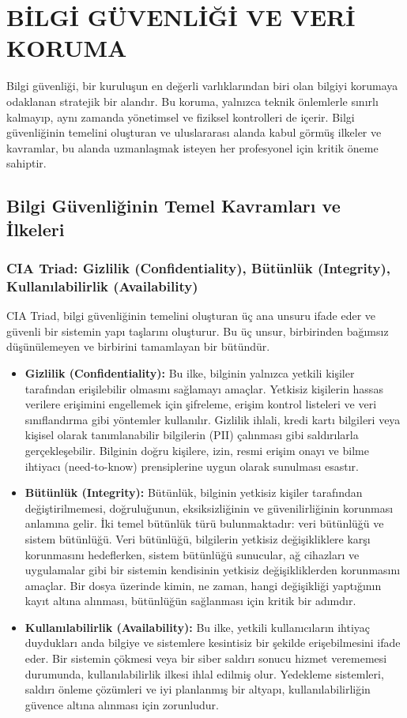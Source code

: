 \chapter{BİLGİ GÜVENLİĞİ VE VERİ KORUMA}

Bilgi güvenliği, bir kuruluşun en değerli varlıklarından biri olan bilgiyi korumaya odaklanan stratejik bir alandır. Bu koruma, yalnızca teknik önlemlerle sınırlı kalmayıp, aynı zamanda yönetimsel ve fiziksel kontrolleri de içerir. Bilgi güvenliğinin temelini oluşturan ve uluslararası alanda kabul görmüş ilkeler ve kavramlar, bu alanda uzmanlaşmak isteyen her profesyonel için kritik öneme sahiptir.

\section{Bilgi Güvenliğinin Temel Kavramları ve İlkeleri}

\subsection{CIA Triad: Gizlilik (Confidentiality), Bütünlük (Integrity), Kullanılabilirlik (Availability)}

CIA Triad, bilgi güvenliğinin temelini oluşturan üç ana unsuru ifade eder ve güvenli bir sistemin yapı taşlarını oluşturur. Bu üç unsur, birbirinden bağımsız düşünülemeyen ve birbirini tamamlayan bir bütündür.

\begin{itemize}
    \item \textbf{Gizlilik (Confidentiality):} Bu ilke, bilginin yalnızca yetkili kişiler tarafından erişilebilir olmasını sağlamayı amaçlar. Yetkisiz kişilerin hassas verilere erişimini engellemek için şifreleme, erişim kontrol listeleri ve veri sınıflandırma gibi yöntemler kullanılır. Gizlilik ihlali, kredi kartı bilgileri veya kişisel olarak tanımlanabilir bilgilerin (PII) çalınması gibi saldırılarla gerçekleşebilir. Bilginin doğru kişilere, izin, resmi erişim onayı ve bilme ihtiyacı (need-to-know) prensiplerine uygun olarak sunulması esastır.
    \item \textbf{Bütünlük (Integrity):} Bütünlük, bilginin yetkisiz kişiler tarafından değiştirilmemesi, doğruluğunun, eksiksizliğinin ve güvenilirliğinin korunması anlamına gelir. İki temel bütünlük türü bulunmaktadır: veri bütünlüğü ve sistem bütünlüğü. Veri bütünlüğü, bilgilerin yetkisiz değişikliklere karşı korunmasını hedeflerken, sistem bütünlüğü sunucular, ağ cihazları ve uygulamalar gibi bir sistemin kendisinin yetkisiz değişikliklerden korunmasını amaçlar. Bir dosya üzerinde kimin, ne zaman, hangi değişikliği yaptığının kayıt altına alınması, bütünlüğün sağlanması için kritik bir adımdır.
    \item \textbf{Kullanılabilirlik (Availability):} Bu ilke, yetkili kullanıcıların ihtiyaç duydukları anda bilgiye ve sistemlere kesintisiz bir şekilde erişebilmesini ifade eder. Bir sistemin çökmesi veya bir siber saldırı sonucu hizmet verememesi durumunda, kullanılabilirlik ilkesi ihlal edilmiş olur. Yedekleme sistemleri, saldırı önleme çözümleri ve iyi planlanmış bir altyapı, kullanılabilirliğin güvence altına alınması için zorunludur.
\end{itemize}

